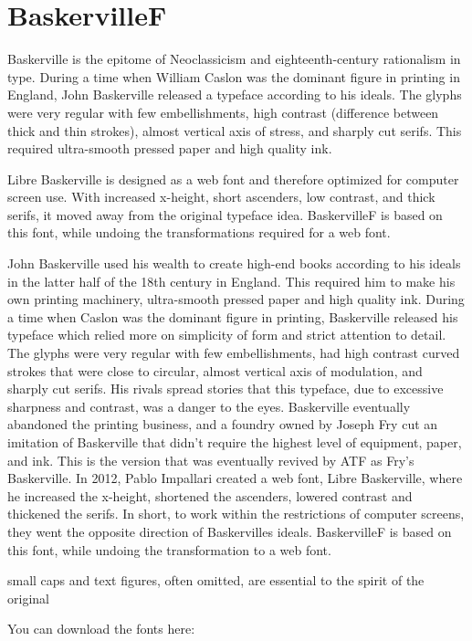 \switchtobodyfont[baskervillef,10pt]
\chapter[baskervillef]{BaskervilleF}

Baskerville is the epitome of Neoclassicism and eighteenth-century rationalism in type. During a time when William Caslon was the dominant figure in printing in England, John Baskerville released a typeface according to his ideals. The glyphs were very regular with few embellishments, high contrast (difference between thick and thin strokes), almost vertical axis of stress, and sharply cut serifs. This required ultra-smooth pressed paper and high quality ink. 

Libre Baskerville is designed as a web font and therefore optimized for computer screen use. With increased x-height, short ascenders, low contrast, and thick serifs, it moved away from the original typeface idea. BaskervilleF is based on this font, while undoing the transformations required for a web font.

John Baskerville used his wealth to create high-end books according to his ideals in the latter half of the 18th century in England. This required him to make his own printing machinery, ultra-smooth pressed paper and high quality ink. During a time when Caslon was the dominant figure in printing, Baskerville released his typeface which relied more on simplicity of form and strict attention to detail. The glyphs were very regular with few embellishments, had high contrast curved strokes that were close to circular, almost vertical axis of modulation, and sharply cut serifs. His rivals spread stories that this typeface, due to excessive sharpness and contrast, was a danger to the eyes. Baskerville eventually abandoned the printing business, and a foundry owned by Joseph Fry cut an imitation of Baskerville that didn't require the highest level of equipment, paper, and ink. This is the version that was eventually revived by ATF as Fry's Baskerville. In 2012, Pablo Impallari created a web font, Libre Baskerville, where he increased the x-height, shortened the ascenders, lowered contrast and thickened the serifs. In short, to work within the restrictions of computer screens, they went the opposite direction of Baskervilles ideals. BaskervilleF is based on this font, while undoing the transformation to a web font.

small caps and text figures,
often omitted, are essential to the spirit of the original

You can download the fonts here:  
